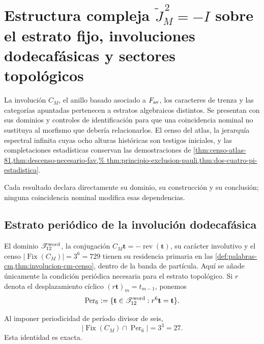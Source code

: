 \ifdefined\HMTIncludeCMBlock
\chapter[Estructura compleja \texorpdfstring{\(\widetilde J_M^{\,2}=-I\)}{J M al cuadrado = -I} y sectores topológicos]
{Estructura compleja \texorpdfstring{\(\widetilde J_M^{\,2}=-I\)}{J M al cuadrado = -I} sobre el estrato fijo, involuciones dodecafásicas y sectores topológicos}
\label{chap:sectores-topologicos-no-omision}

La involución \(C_M\), el anillo basado asociado a \(F_{\rm av}\), los
caracteres de trenza y las categorías apuntadas pertenecen a estratos
algebraicos distintos. Se presentan con sus dominios y controles de
identificación para que una coincidencia nominal no sustituya al morfismo que
debería relacionarlos. El censo del atlas, la jerarquía espectral infinita
cuyas ocho alturas históricas son testigos iniciales, y las completaciones
estadísticas conservan las demostraciones de
\cref{thm:censo-atlas-81,thm:descenso-necesario-fav,%
thm:principio-exclusion-pauli,thm:dos-cuatro-pi-estadistica}.

Cada resultado declara directamente su dominio, su construcción y su
conclusión; ninguna coincidencia nominal modifica esas dependencias.

\section{Estrato periódico de la involución dodecafásica}
\label{sec:involucion-cm-censo}

El dominio \(\mathscr T_{12}^{\rm word}\), la conjugación
\(C_M\mathbf t=-\operatorname{rev}(\mathbf t)\), su carácter involutivo y el
censo \(\lvert\operatorname{Fix}(C_M)\rvert=3^6=729\) tienen su residencia
primaria en las
\cref{def:palabras-cm,thm:involucion-cm-censo}, dentro de la banda de
partícula. Aquí se añade únicamente la condición periódica necesaria para el
estrato topológico. Si \(r\) denota el desplazamiento cíclico
\((r\mathbf t)_m=t_{m-1}\), ponemos
\[
 \operatorname{Per}_6
 :=\{\mathbf t\in\mathscr T_{12}^{\rm word}:r^6\mathbf t=\mathbf t\}.
\]

\begin{proposition}
\label{prop:estrato-periodico-cm-rev7}
Al imponer periodicidad de período divisor de seis,
\[
 \bigl|\operatorname{Fix}(C_M)\cap\operatorname{Per}_6\bigr|
 =3^3=27.
\]
Esta identidad es exacta.
\end{proposition}

